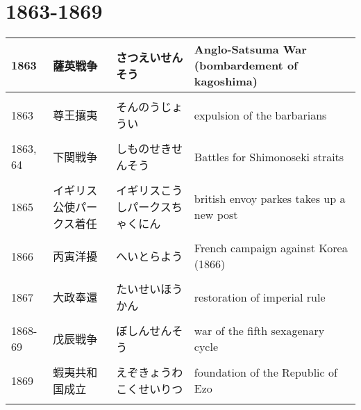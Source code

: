 \documentclass{article}
\begin{document}
\section{1863-1869}
\begin{tabular}{p{1.8cm} | p{3.0cm} | p{4.5cm} | p{7.5cm}}
1863 & 薩英戦争 & さつえいせんそう & Anglo-Satsuma War (bombardement of kagoshima) \\ \hline \\[-1em]
1863 & 尊王攘夷 & そんのうじょうい & expulsion of the barbarians \\ \hline \\[-1em]
1863, 64 & 下関戦争 & しものせきせんそう & Battles for Shimonoseki straits \\ \hline \\[-1em]
1865 & イギリス公使パークス着任 & イギリスこうしパークスちゃくにん & british envoy parkes takes up a new post \\ \hline \\[-1em]
1866 & 丙寅洋擾 & へいとらよう & French campaign against Korea (1866)​ \\ \hline \\[-1em]
1867 & 大政奉還 & たいせいほうかん & restoration of imperial rule \\ \hline \\[-1em]
1868-69 & 戊辰戦争 & ぼしんせんそう & war of the fifth sexagenary cycle​ \\ \hline \\[-1em]
1869 & 蝦夷共和国成立 & えぞきょうわこくせいりつ & foundation of the Republic of Ezo​ \\ \hline \\[-1em]
\end{tabular}
\end{document}
